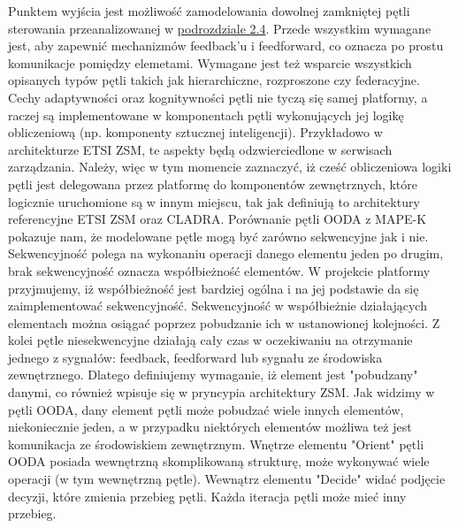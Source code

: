 Punktem wyjścia jest możliwość zamodelowania dowolnej zamkniętej pętli sterowania przeanalizowanej w \hyperlink{sec:25}{podrozdziale 2.4}. Przede wszystkim wymagane jest, aby zapewnić  mechanizmów feedback'u i feedforward, co oznacza po prostu komunikacje pomiędzy elemetami. Wymagane jest też wsparcie wszystkich opisanych typów pętli takich jak hierarchiczne, rozproszone czy federacyjne. Cechy adaptywności oraz kognitywności pętli nie tyczą się samej platformy, a raczej są implementowane w komponentach pętli wykonujących jej logikę obliczeniową (np. komponenty sztucznej inteligencji). Przykładowo w architekturze ETSI ZSM, te aspekty będą odzwierciedlone w serwisach zarządzania. Należy, więc w tym momencie zaznaczyć, iż cześć obliczeniowa logiki pętli jest delegowana przez platformę do komponentów zewnętrznych, które logicznie uruchomione są w innym miejscu, tak jak definiują to architektury referencyjne ETSI ZSM oraz CLADRA. Porównanie pętli OODA z MAPE-K pokazuje nam, że modelowane pętle mogą być zarówno sekwencyjne jak i nie. Sekwencyjność polega na wykonaniu operacji danego elementu jeden po drugim, brak sekwencyjność oznacza współbieżność elementów. W projekcie platformy przyjmujemy, iż współbieżność jest bardziej ogólna i na jej podstawie da się zaimplementować sekwencyjność. Sekwencyjność w współbieżnie działających elementach można osiągać poprzez pobudzanie ich w ustanowionej kolejności. Z kolei pętle niesekwencyjne działają cały czas w oczekiwaniu na otrzymanie jednego z sygnałów: feedback, feedforward lub sygnału ze środowiska zewnętrznego. Dlatego definiujemy wymaganie, iż element jest "pobudzany" danymi, co również wpisuje się w pryncypia architektury ZSM. Jak widzimy w pętli OODA, dany element pętli może pobudzać wiele innych elementów, niekoniecznie jeden, a w przypadku niektórych elementów możliwa też jest komunikacja ze środowiskiem zewnętrznym. Wnętrze elementu "Orient" pętli OODA posiada wewnętrzną skomplikowaną strukturę, może wykonywać wiele operacji (w tym wewnętrzną pętle). Wewnątrz elementu "Decide" widać podjęcie decyzji, które zmienia przebieg pętli. Każda iteracja pętli może mieć inny przebieg. 

